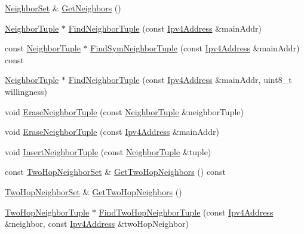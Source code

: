 \begin{DoxyCompactItemize}
\item 
\hyperlink{namespacens3_1_1olsr_af0afef1f28c6f0a0b528b03b638df05d}{Neighbor\+Set} \& \hyperlink{classns3_1_1olsr_1_1OlsrState_a039866eb24adf7de420484db8e8b8d8a}{Get\+Neighbors} ()
\item 
\hyperlink{structns3_1_1olsr_1_1NeighborTuple}{Neighbor\+Tuple} $\ast$ \hyperlink{classns3_1_1olsr_1_1OlsrState_ae116327f63bf588f61e55c7e3f905787}{Find\+Neighbor\+Tuple} (const \hyperlink{classns3_1_1Ipv4Address}{Ipv4\+Address} \&main\+Addr)
\item 
const \hyperlink{structns3_1_1olsr_1_1NeighborTuple}{Neighbor\+Tuple} $\ast$ \hyperlink{classns3_1_1olsr_1_1OlsrState_aa26af34492ae406f145c53bd189ed7fb}{Find\+Sym\+Neighbor\+Tuple} (const \hyperlink{classns3_1_1Ipv4Address}{Ipv4\+Address} \&main\+Addr) const 
\item 
\hyperlink{structns3_1_1olsr_1_1NeighborTuple}{Neighbor\+Tuple} $\ast$ \hyperlink{classns3_1_1olsr_1_1OlsrState_a6ebf4c587f29a23061a6cd270bcf03e8}{Find\+Neighbor\+Tuple} (const \hyperlink{classns3_1_1Ipv4Address}{Ipv4\+Address} \&main\+Addr, uint8\+\_\+t willingness)
\item 
void \hyperlink{classns3_1_1olsr_1_1OlsrState_a651042cf0a72009f202932679c5eb1eb}{Erase\+Neighbor\+Tuple} (const \hyperlink{structns3_1_1olsr_1_1NeighborTuple}{Neighbor\+Tuple} \&neighbor\+Tuple)
\item 
void \hyperlink{classns3_1_1olsr_1_1OlsrState_a2883957f121a835823957c752c80c873}{Erase\+Neighbor\+Tuple} (const \hyperlink{classns3_1_1Ipv4Address}{Ipv4\+Address} \&main\+Addr)
\item 
void \hyperlink{classns3_1_1olsr_1_1OlsrState_a94907867178616f16e98d62455f29910}{Insert\+Neighbor\+Tuple} (const \hyperlink{structns3_1_1olsr_1_1NeighborTuple}{Neighbor\+Tuple} \&tuple)
\item 
const \hyperlink{namespacens3_1_1olsr_a5f9963792af7fea4dc66fb8718394604}{Two\+Hop\+Neighbor\+Set} \& \hyperlink{classns3_1_1olsr_1_1OlsrState_ab03738874d0d785b770beef6dc9c2e1a}{Get\+Two\+Hop\+Neighbors} () const 
\item 
\hyperlink{namespacens3_1_1olsr_a5f9963792af7fea4dc66fb8718394604}{Two\+Hop\+Neighbor\+Set} \& \hyperlink{classns3_1_1olsr_1_1OlsrState_a3f514518527c071461fa51d454e6884b}{Get\+Two\+Hop\+Neighbors} ()
\item 
\hyperlink{structns3_1_1olsr_1_1TwoHopNeighborTuple}{Two\+Hop\+Neighbor\+Tuple} $\ast$ \hyperlink{classns3_1_1olsr_1_1OlsrState_a420ef02aeb9997bff09bbebd6a72e642}{Find\+Two\+Hop\+Neighbor\+Tuple} (const \hyperlink{classns3_1_1Ipv4Address}{Ipv4\+Address} \&neighbor, const \hyperlink{classns3_1_1Ipv4Address}{Ipv4\+Address} \&two\+Hop\+Neighbor)

\end{DoxyCompactItemize}
